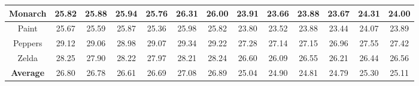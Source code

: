 \begin{table}[t]
\begin{adjustwidth}{-0.5cm}{}
\begin{center}
\begin{tabular}{|c||c|c|c|c|c|c||c|c|c|c|c|c|}
\\
\hline
 Monarch  & 25.82 & 25.88 & 25.94 & 25.76 & 26.31 & 26.00   & 23.91 & 23.66  &  23.88   &  23.67& 24.31 & 24.00   
\\
\hline
 Paint & 25.67 & 25.59 & 25.87 & 25.36 &25.98 & 25.82     &  23.80 & 23.52 &  23.88 & 23.44 &24.07 & 23.89  
\\
\hline
 Peppers & 29.12 & 29.06 & 28.98 & 29.07 & 29.34 & 29.22     & 27.28 & 27.14 &  27.15 & 26.96 &  27.55   & 27.42
\\
\hline
 Zelda  & 28.25 & 27.90 & 28.22 & 27.97 & 28.21 & 28.24       & 26.60 & 26.09 &  26.55  & 26.21  & 26.44 & 26.56
\\
\hline
 \textbf{Average}& 26.80 &  26.78 &  26.61  & 26.69  & 27.08 & 26.89    &25.04 &24.90 &24.81 &24.79 &25.30 &25.11     
\\
\hline
\end{tabular}
\end{center}
\end{adjustwidth}
\end{table}


